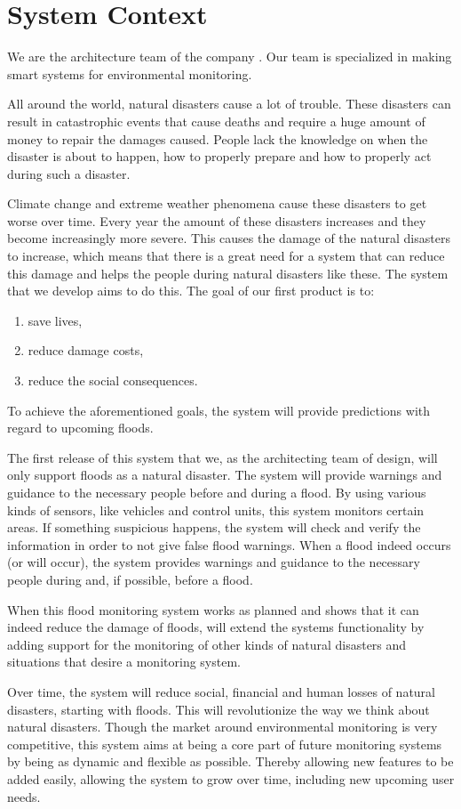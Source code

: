 \chapter{System Context}
\label{ch:context}

We are the architecture team of the company \CompanyName. Our team is specialized in making smart systems for environmental monitoring.

All around the world, natural disasters cause a lot of trouble. These disasters can result in catastrophic events that cause deaths and require a huge amount of money to repair the damages caused. People lack the knowledge on when the disaster is about to happen, how to properly prepare and how to properly act during such a disaster.

Climate change and extreme weather phenomena cause these disasters to get worse over time. Every year the amount of these disasters increases and they become increasingly more severe. This causes the damage of the natural disasters to increase, which means that there is a great need for a system that can reduce this damage and helps the people during natural disasters like these. The system that we develop aims to do this.
The goal of our first product is to:
\begin{enumerate}
  \item save lives,
  \item reduce damage costs,
  \item reduce the social consequences.
\end{enumerate}

To achieve the aforementioned goals, the system will provide predictions with regard to upcoming floods.

The first release of this system that we, as the architecting team of \CompanyName design, will only support floods as a natural disaster. The system will provide warnings and guidance to the necessary people before and during a flood. By using various kinds of sensors, like vehicles and control units, this system monitors certain areas. If something suspicious happens, the system will check and verify the information in order to not give false flood warnings. When a flood indeed occurs (or will occur), the system   provides warnings and guidance to the necessary people during and, if possible, before a flood. 

When this flood monitoring system works as planned and shows that it can indeed reduce the damage of floods, \CompanyName will extend the systems functionality  by adding support for the monitoring of other kinds of natural disasters and situations that desire a monitoring system.

Over time, the system will reduce social, financial and human losses of natural disasters, starting with floods. This will revolutionize the way we think about natural disasters. Though the market around environmental monitoring is very competitive, this system aims at being a core part of future monitoring systems by being as dynamic and flexible as possible. Thereby allowing new features to be added easily, allowing the system to grow over time, including new upcoming user needs.